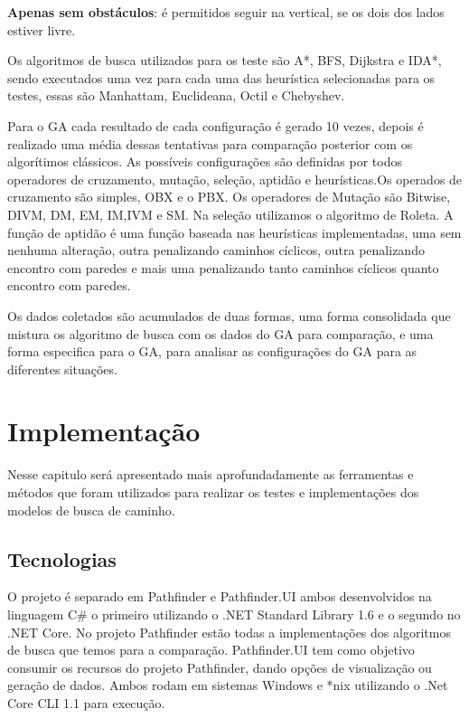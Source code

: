 \textbf{Apenas sem obstáculos}: é permitidos seguir na vertical, se os dois dos lados estiver livre.

\begin{minipage}{\linewidth}
    \label{fig:d_noobstacle}
\end{minipage}


Os algoritmos de busca utilizados para os teste são A\**, BFS, Dijkstra e IDA\**, sendo executados uma vez para cada uma das heurística selecionadas para os testes, essas são Manhattam, Euclideana, Octil e Chebyshev.

Para o GA cada resultado de cada configuração é gerado 10 vezes, depois é realizado uma média dessas tentativas para comparação posterior com os algorítimos clássicos. As possíveis configurações são definidas por todos operadores de cruzamento, mutação, seleção, aptidão e heurísticas.Os operados de cruzamento são simples, OBX e o PBX. Os operadores de Mutação são Bitwise, DIVM, DM, EM, IM,IVM e SM. Na seleção utilizamos o algoritmo de Roleta. A função de aptidão é uma função baseada nas heurísticas implementadas, uma sem nenhuma alteração, outra penalizando caminhos cíclicos, outra penalizando encontro com paredes e mais uma penalizando tanto caminhos cíclicos quanto encontro com paredes.

Os dados coletados são acumulados de duas formas, uma forma consolidada que mistura os algoritmo de busca com os dados do GA para comparação, e uma forma especifica para o GA, para analisar as configurações do GA para as diferentes situações.

\chapter[Implementação]{Implementação}

Nesse capitulo será apresentado mais aprofundadamente as ferramentas e métodos que foram utilizados para realizar os testes  e implementações dos modelos de busca de caminho.

\section{Tecnologias}
O projeto é separado em Pathfinder e Pathfinder.UI ambos desenvolvidos na linguagem C\# o primeiro utilizando o .NET Standard Library 1.6 e o segundo no .NET Core. No projeto Pathfinder estão todas a  implementações dos algoritmos de busca que temos para a comparação. Pathfinder.UI tem como objetivo consumir os recursos do projeto Pathfinder, dando opções de visualização ou geração de dados. Ambos rodam em sistemas Windows e \**nix utilizando o .Net Core CLI 1.1 para execução.

